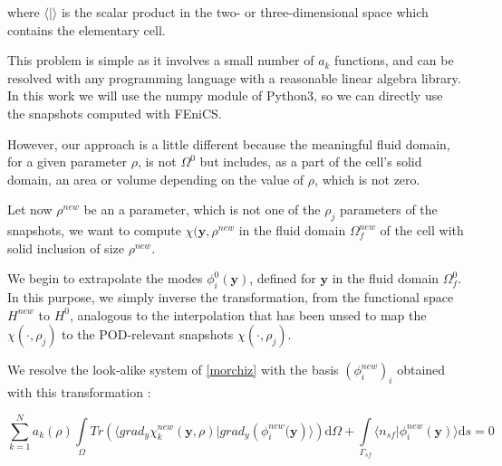 where $\langle |\rangle$ is the scalar product in the two- or three-dimensional space which contains the elementary cell.

\par
This problem is simple as it involves a small number of $a_k$ functions, and can be resolved with any programming language with a reasonable linear algebra library. %
In this work we will use the numpy module of Python3, so we can directly use the snapshots computed with FEniCS.


\etoile
However, our approach is a little different because the meaningful fluid domain, for a given parameter $\rho$, %
is not $\Omega^0$ but includes, as a part of the cell's solid domain, an area or volume depending on the value of $\rho$, %
which is not zero.

\par
Let now $\rho^{new}$ be an a parameter, which is not one of the $\rho_j$ parameters of the snapshots, %
we want to compute $\chi(\mathbf{y},\rho^{new}$ in the fluid domain $\Omega_f^{new}$ of the cell with solid inclusion of size $\rho^{new}$.

\par
We begin to extrapolate the modes $\phi_i^0(\mathbf{y})$, defined for $\mathbf{y}$ in the fluid domain $\Omega_f^0$. %
In this purpose, we simply inverse the transformation, from the functional space $H^{new}$ to $H^0$, %
analogous to the interpolation that has been unsed to map the $\chi(\cdot,\rho_j)$ to the POD-relevant snapshots $\chi (\cdot ,\rho_j)$.

\par
We resolve the look-alike system of \ref{morchiz} with the basis $(\phi_i^{new})_i$ obtained with this transformation :

\begin{equation}\label{morchi}
\sum\limits_{k=1}^N a_k(\rho)\int\limits_{\Omega}Tr\left(\langle grad_y\chi_k^{new} \left(\mathbf{y},\rho\right)|grad_y\left(\phi_i^{new}(\mathbf{y}\right)\rangle\right)\text{d}\Omega+%
\int\limits_{\Gamma_{sf}}\langle n_{sf}|\phi_i^{new}(\mathbf{y})\rangle \text{d}s %
=0
\end{equation}


